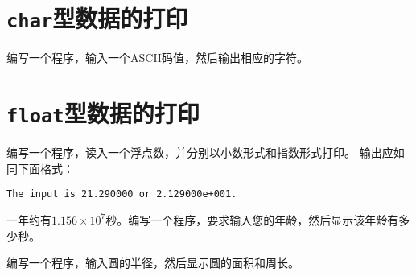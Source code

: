 \section{\lstinline|char|型数据的打印}
\begin{frame}\ft{\secname}
\begin{biancheng} 
编写一个程序，输入一个ASCII码值，然后输出相应的字符。
\end{biancheng}
\end{frame}


\section{\lstinline|float|型数据的打印}
\begin{frame}[fragile]\ft{\secname}
\begin{biancheng} 
编写一个程序，读入一个浮点数，并分别以小数形式和指数形式打印。
输出应如同下面格式：
\begin{lstlisting}
The input is 21.290000 or 2.129000e+001.
\end{lstlisting}
\end{biancheng}
\end{frame}


\begin{frame}[fragile]\ft{\secname}
\begin{biancheng} 
一年约有$1.156\times 10^7$秒。编写一个程序，要求输入您的年龄，然后显示该年龄有多少秒。
\end{biancheng}
\end{frame}


\begin{frame}[fragile]\ft{\secname}
\begin{biancheng} 
编写一个程序，输入圆的半径，然后显示圆的面积和周长。
\end{biancheng}
\end{frame}

